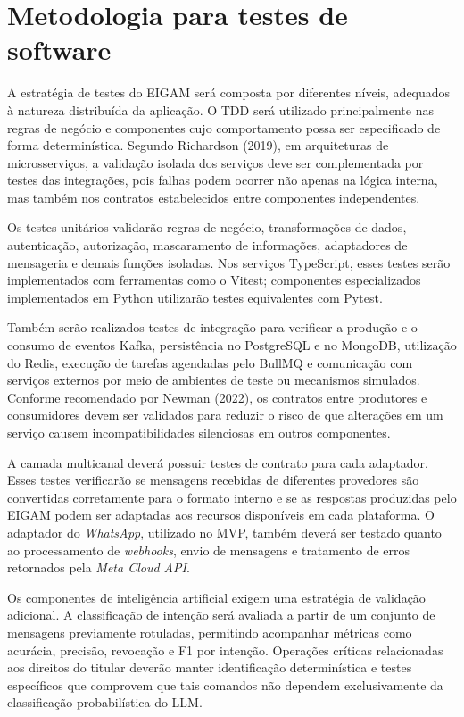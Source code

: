 \section{Metodologia para testes de software}

A estratégia de testes do EIGAM será composta por diferentes níveis, adequados à natureza distribuída da aplicação. O TDD será utilizado principalmente nas regras de negócio e componentes cujo comportamento possa ser especificado de forma determinística. Segundo Richardson (2019), em arquiteturas de microsserviços, a validação isolada dos serviços deve ser complementada por testes das integrações, pois falhas podem ocorrer não apenas na lógica interna, mas também nos contratos estabelecidos entre componentes independentes.

Os testes unitários validarão regras de negócio, transformações de dados, autenticação, autorização, mascaramento de informações, adaptadores de mensageria e demais funções isoladas. Nos serviços TypeScript, esses testes serão implementados com ferramentas como o Vitest; componentes especializados implementados em Python utilizarão testes equivalentes com Pytest.

Também serão realizados testes de integração para verificar a produção e o consumo de eventos Kafka, persistência no PostgreSQL e no MongoDB, utilização do Redis, execução de tarefas agendadas pelo BullMQ e comunicação com serviços externos por meio de ambientes de teste ou mecanismos simulados. Conforme recomendado por Newman (2022), os contratos entre produtores e consumidores devem ser validados para reduzir o risco de que alterações em um serviço causem incompatibilidades silenciosas em outros componentes.

A camada multicanal deverá possuir testes de contrato para cada adaptador. Esses testes verificarão se mensagens recebidas de diferentes provedores são convertidas corretamente para o formato interno e se as respostas produzidas pelo EIGAM podem ser adaptadas aos recursos disponíveis em cada plataforma. O adaptador do \textit{WhatsApp}, utilizado no MVP, também deverá ser testado quanto ao processamento de \textit{webhooks}, envio de mensagens e tratamento de erros retornados pela \textit{Meta Cloud API}.

Os componentes de inteligência artificial exigem uma estratégia de validação adicional. A classificação de intenção será avaliada a partir de um conjunto de mensagens previamente rotuladas, permitindo acompanhar métricas como acurácia, precisão, revocação e F1 por intenção. Operações críticas relacionadas aos direitos do titular deverão manter identificação determinística e testes específicos que comprovem que tais comandos não dependem exclusivamente da classificação probabilística do LLM.

